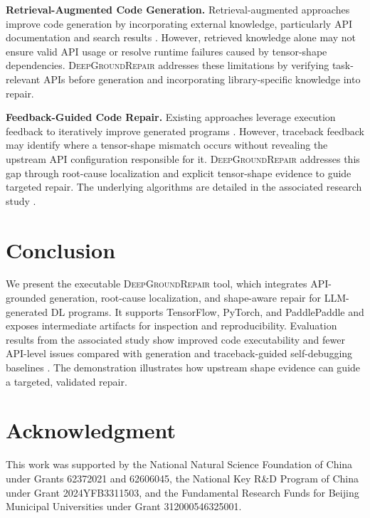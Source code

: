 \documentclass[10pt,conference]{IEEEtran}
\begin{document}
\noindent\textbf{Retrieval-Augmented Code Generation.}
Retrieval-augmented approaches improve code generation by incorporating external knowledge, particularly API documentation and search results \cite{rag,docprompting,toolcoder,chen2025apidoc,jain2025apidoc}. However, retrieved knowledge alone may not ensure valid API usage or resolve runtime failures caused by tensor-shape dependencies. \textsc{DeepGroundRepair} addresses these limitations by verifying task-relevant APIs before generation and incorporating library-specific knowledge into repair.

\noindent\textbf{Feedback-Guided Code Repair.}
Existing approaches leverage execution feedback to iteratively improve generated programs \cite{coderl,selfrepair,olausson2024selfrepair,codecorrectness}. However, traceback feedback may identify where a tensor-shape mismatch occurs without revealing the upstream API configuration responsible for it. \textsc{DeepGroundRepair} addresses this gap through root-cause localization and explicit tensor-shape evidence to guide targeted repair. The underlying algorithms are detailed in the associated research study \cite{deepgroundrepair}.


\section{Conclusion}
We present the executable \textsc{DeepGroundRepair} tool, which integrates API-grounded generation, root-cause localization, and shape-aware repair for LLM-generated DL programs. It supports TensorFlow, PyTorch, and PaddlePaddle and exposes intermediate artifacts for inspection and reproducibility. Evaluation results from the associated study show improved code executability and fewer API-level issues compared with generation and traceback-guided self-debugging baselines \cite{deepgroundrepair}. The demonstration illustrates how upstream shape evidence can guide a targeted, validated repair.
 
\section{Acknowledgment}
This work was supported by the National Natural Science Foundation of China under Grants 62372021 and 62606045, the National Key R\&D Program of China under Grant 2024YFB3311503, and the Fundamental Research Funds for Beijing Municipal Universities under Grant 312000546325001.




\end{document}
